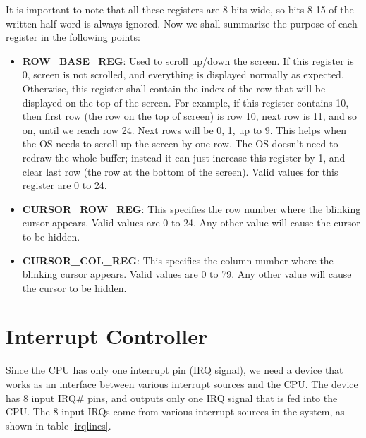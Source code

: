 \documentclass[oneside]{book}
\begin{document}
It is important to note that all these registers are 8 bits wide, so
bits 8-15 of the written half-word is always ignored. Now we shall
summarize the purpose of each register in the following points:

\begin{itemize}

\item \textbf{ROW\_BASE\_REG}:
Used to scroll up/down the screen. If this register is 0, screen is not
scrolled, and everything is displayed normally as expected. Otherwise,
this register shall contain the index of the row that will be displayed
on the top of the screen. For example, if this register contains 10, then
first row (the row on the top of screen) is row 10, next row is 11, and so on,
until we reach row 24. Next rows will be 0, 1, up to 9. This helps when the
OS needs to scroll up the screen by one row. The OS doesn't need to redraw
the whole buffer; instead it can just increase this register by 1, and clear
last row (the row at the bottom of the screen). Valid values for this
register are 0 to 24.

\item \textbf{CURSOR\_ROW\_REG}:
This specifies the row number where the blinking cursor appears. Valid
values are 0 to 24. Any other value will cause the cursor to be hidden.

\item \textbf{CURSOR\_COL\_REG}:
This specifies the column number where the blinking cursor appears. Valid
values are 0 to 79. Any other value will cause the cursor to be hidden.

\end{itemize}

\section{Interrupt Controller}

Since the CPU has only one interrupt pin (IRQ signal), we need a device
that works as an interface between various interrupt sources and the CPU.
The device has 8 input IRQ\# pins, and outputs only one IRQ signal that
is fed into the CPU. The 8 input IRQs come from various interrupt sources
in the system, as shown in table \ref{irqlines}.
\end{document}
